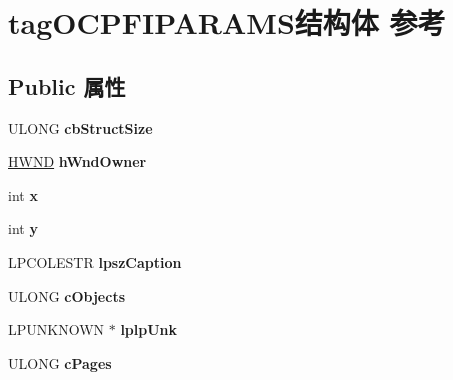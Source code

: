 \hypertarget{structtag_o_c_p_f_i_p_a_r_a_m_s}{}\section{tag\+O\+C\+P\+F\+I\+P\+A\+R\+A\+M\+S结构体 参考}
\label{structtag_o_c_p_f_i_p_a_r_a_m_s}
\subsection*{Public 属性}
\begin{DoxyCompactItemize}
\item 
\mbox{\label{structtag_o_c_p_f_i_p_a_r_a_m_s_a8d2bcba4b63ac0c6426b7ef80c91abc8}} 
U\+L\+O\+NG {\bfseries cb\+Struct\+Size}
\item 
\mbox{\label{structtag_o_c_p_f_i_p_a_r_a_m_s_a5ccb3380581bc946a3a5d3e0db0b5e2a}} 
\hyperlink{interfacevoid}{H\+W\+ND} {\bfseries h\+Wnd\+Owner}
\item 
\mbox{\label{structtag_o_c_p_f_i_p_a_r_a_m_s_a7e66f1311681937aa1fa1c1c81d9e70b}} 
int {\bfseries x}
\item 
\mbox{\label{structtag_o_c_p_f_i_p_a_r_a_m_s_a66c669fff06b82b41bdfe8aee32e3495}} 
int {\bfseries y}
\item 
\mbox{\label{structtag_o_c_p_f_i_p_a_r_a_m_s_a95fd873215b1308b17ea9bd6ed22a571}} 
L\+P\+C\+O\+L\+E\+S\+TR {\bfseries lpsz\+Caption}
\item 
\mbox{\label{structtag_o_c_p_f_i_p_a_r_a_m_s_af3a53e548683dc5b9b5efcfb0b494680}} 
U\+L\+O\+NG {\bfseries c\+Objects}
\item 
\mbox{\label{structtag_o_c_p_f_i_p_a_r_a_m_s_a9ddd66313aae39b092ea5d8a4584081b}} 
L\+P\+U\+N\+K\+N\+O\+WN $\ast$ {\bfseries lplp\+Unk}
\item 
\mbox{\label{structtag_o_c_p_f_i_p_a_r_a_m_s_abf05bc0940263cbabffcaf45ce5ba075}} 
U\+L\+O\+NG {\bfseries c\+Pages}

\end{DoxyCompactItemize}
